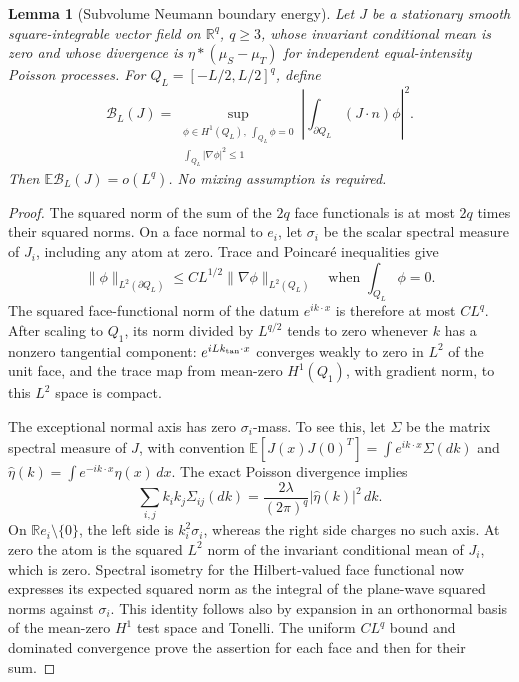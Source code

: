 \documentclass[11pt,reqno]{amsart}
\newtheorem{lemma}[theorem]{Lemma}
\theoremstyle{definition}
\theoremstyle{remark}
\numberwithin{equation}{section}
\newcommand{\R}{\mathbb R}
\newcommand{\E}{\mathbb E}
\begin{document}
\begin{lemma}[Subvolume Neumann boundary energy]
\label{lem:highd-current-boundary}
Let \(J\) be a stationary smooth square-integrable vector field on
\(\R^q\), \(q\ge3\), whose invariant conditional mean is zero and
whose divergence is \(\eta*(\mu_S-\mu_T)\) for independent equal-intensity
Poisson processes. For \(Q_L=[-L/2,L/2]^q\), define
\[
 \mathcal B_L(J)=
 \sup_{\substack{\phi\in H^1(Q_L),\ \int_{Q_L}\phi=0\\
                         \int_{Q_L}|\nabla\phi|^2\le1}}
 \left|\int_{\partial Q_L}(J\cdot n)\phi\right|^2.
\]
Then \(\E\mathcal B_L(J)=o(L^q)\). No mixing assumption is required.
\end{lemma}
\begin{proof}
The squared norm of the sum of the \(2q\) face functionals is at most
\(2q\) times their squared norms. On a face normal to \(e_i\), let
\(\sigma_i\) be the scalar spectral measure of \(J_i\), including any
atom at zero. Trace and Poincar\'e inequalities give
\[
 \|\phi\|_{L^2(\partial Q_L)}
       \le C L^{1/2}\|\nabla\phi\|_{L^2(Q_L)}
       \quad\text{when }\int_{Q_L}\phi=0.
\]
The squared face-functional norm of the datum \(e^{ik\cdot x}\) is
therefore at most \(CL^q\). After scaling to \(Q_1\), its norm divided
by \(L^{q/2}\) tends to zero whenever \(k\) has a nonzero tangential
component: \(e^{iLk_{\rm tan}\cdot x}\) converges weakly to zero in
\(L^2\) of the unit face, and the trace map from mean-zero \(H^1(Q_1)\),
with gradient norm, to this \(L^2\) space is compact.

The exceptional normal axis has zero \(\sigma_i\)-mass. To see this,
let \(\Sigma\) be the matrix spectral measure of \(J\), with convention
\(\E[J(x)J(0)^T]=\int e^{ik\cdot x}\Sigma(dk)\) and
\(\widehat\eta(k)=\int e^{-ik\cdot x}\eta(x)\,dx\).
The exact Poisson divergence implies
\begin{equation}
\label{eq:highd-current-spectrum}
 \sum_{i,j}k_i k_j\Sigma_{ij}(dk)
       =\frac{2\lambda}{(2\pi)^q}|\widehat\eta(k)|^2\,dk.
\end{equation}
On \(\R e_i\setminus\{0\}\), the left side is \(k_i^2\sigma_i\),
whereas the right side charges no such axis. At zero the atom is the
squared \(L^2\) norm of the invariant conditional mean of \(J_i\),
which is zero. Spectral isometry for the Hilbert-valued face functional
now expresses its expected squared norm as the integral of the
plane-wave squared norms against \(\sigma_i\). This identity follows
also by expansion in an orthonormal basis of the mean-zero \(H^1\)
test space and Tonelli. The uniform \(CL^q\) bound and dominated
convergence prove the assertion for each face and then for their sum.
\end{proof}
\end{document}
